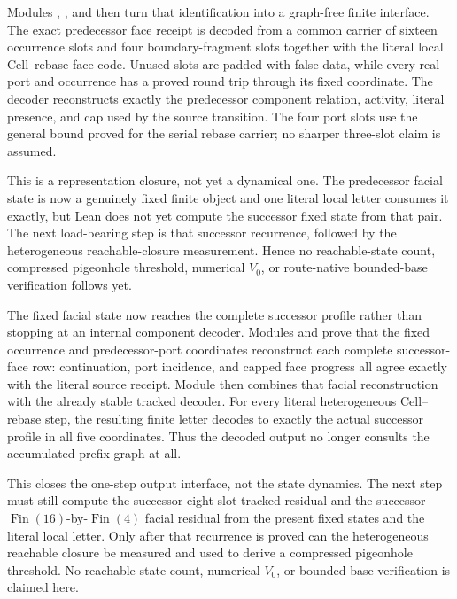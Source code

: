 \documentclass[11pt]{article}
\theoremstyle{definition}
\begin{document}
Modules
,
, and
then turn that identification into a graph-free finite interface.  The exact
predecessor face receipt is decoded from a common carrier of sixteen occurrence
slots and four boundary-fragment slots together with the literal local
Cell--rebase face code.  Unused slots are padded with false data, while every
real port and occurrence has a proved round trip through its fixed coordinate.
The decoder reconstructs exactly the predecessor component relation, activity,
literal presence, and cap used by the source transition.  The four port slots
use the general bound proved for the serial rebase carrier; no sharper
three-slot claim is assumed.

This is a representation closure, not yet a dynamical one.  The predecessor
facial state is now a genuinely fixed finite object and one literal local
letter consumes it exactly, but Lean does not yet compute the successor fixed
state from that pair.  The next load-bearing step is that successor recurrence,
followed by the heterogeneous reachable-closure measurement.  Hence no
reachable-state count, compressed pigeonhole threshold, numerical $V_0$, or
route-native bounded-base verification follows yet.

The fixed facial state now reaches the complete successor profile rather than
stopping at an internal component decoder.  Modules
and
prove that the fixed occurrence and predecessor-port coordinates reconstruct
each complete successor-face row: continuation, port incidence, and capped
face progress all agree exactly with the literal source receipt.  Module
then combines that facial reconstruction with the already stable tracked
decoder.  For every literal heterogeneous Cell--rebase step, the resulting
finite letter decodes to exactly the actual successor profile in all five
coordinates.  Thus the decoded output no longer consults the accumulated
prefix graph at all.

This closes the one-step output interface, not the state dynamics.  The next
step must still compute the successor eight-slot tracked residual and the
successor $\operatorname{Fin}(16)$-by-$\operatorname{Fin}(4)$ facial residual
from the present fixed states and the literal local letter.  Only after that
recurrence is proved can the heterogeneous reachable closure be measured and
used to derive a compressed pigeonhole threshold.  No reachable-state count,
numerical $V_0$, or bounded-base verification is claimed here.
\end{document}
